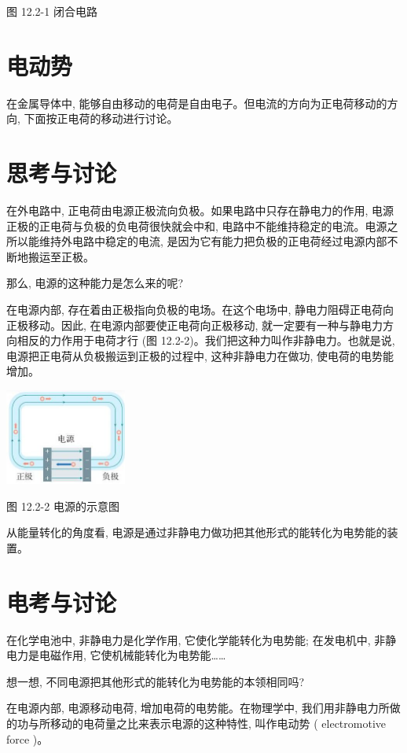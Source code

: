 \documentclass[10pt]{article}
\begin{document}
图 12.2-1 闭合电路

\section*{电动势}

在金属导体中, 能够自由移动的电荷是自由电子。但电流的方向为正电荷移动的方向, 下面按正电荷的移动进行讨论。

\section*{思考与讨论}

在外电路中, 正电荷由电源正极流向负极。如果电路中只存在静电力的作用, 电源正极的正电荷与负极的负电荷很快就会中和, 电路中不能维持稳定的电流。电源之所以能维持外电路中稳定的电流, 是因为它有能力把负极的正电荷经过电源内部不断地搬运至正极。

那么, 电源的这种能力是怎么来的呢?

在电源内部, 存在着由正极指向负极的电场。在这个电场中, 静电力阻碍正电荷向正极移动。因此, 在电源内部要使正电荷向正极移动, 就一定要有一种与静电力方向相反的力作用于电荷才行 (图 12.2-2)。我们把这种力叫作非静电力。也就是说, 电源把正电荷从负极搬运到正极的过程中, 这种非静电力在做功, 使电荷的电势能增加。

\begin{center}
\includegraphics[max width=0.3\textwidth]{images/01911d5f-8e38-70c0-b5b8-2b399bd115b6_88_280009.jpg}
\end{center}

图 12.2-2 电源的示意图

从能量转化的角度看, 电源是通过非静电力做功把其他形式的能转化为电势能的装置。

\section*{电考与讨论}

在化学电池中, 非静电力是化学作用, 它使化学能转化为电势能; 在发电机中, 非静电力是电磁作用, 它使机械能转化为电势能……

想一想, 不同电源把其他形式的能转化为电势能的本领相同吗?

在电源内部, 电源移动电荷, 增加电荷的电势能。在物理学中, 我们用非静电力所做的功与所移动的电荷量之比来表示电源的这种特性, 叫作电动势 ( electromotive force )。
\end{document}
